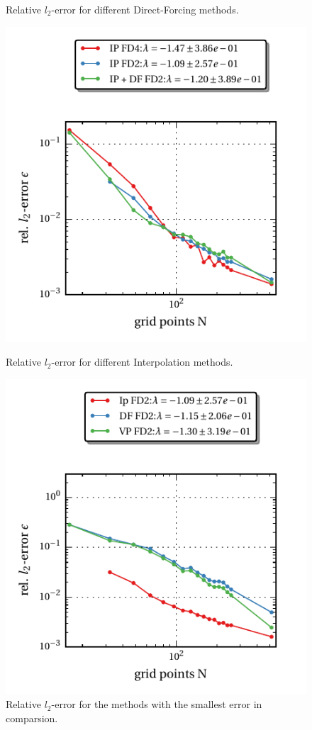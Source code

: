 \begin{figure}[!bp]
\begin{minipage}[c]{0.5\textwidth}
      \caption{Relative $l_2$-error for different Direct-Forcing methods.}
      \label{vali:tc_flow_gc_df}
  \end{minipage}
  \begin{minipage}[c]{0.5\textwidth}
      \includegraphics{gfx/immersed_boundary/tcflow/theo/ip.pdf}
      \caption{Relative $l_2$-error for different Interpolation methods.}
      \label{vali:tc_flow_gc_ip}
  \end{minipage}
  \begin{minipage}[c]{0.5\textwidth}
      \includegraphics{gfx/immersed_boundary/tcflow/theo/all.pdf}
      \caption{Relative $l_2$-error for the methods with the smallest error in comparsion.}
      \label{vali:tc_flow_gc_all}
  \end{minipage}
\end{figure}
\clearpage

